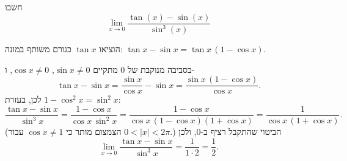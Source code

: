 
\begin{question}
חשבו
\[ \lim_{x\to0}\frac{\tan(x)-\sin(x)}{\sin^3(x)} \]
\end{question}

\begin{hint}
הוציאו $\tan x$ כגורם משותף במונה: $\tan x-\sin x=\tan x\,(1-\cos x)$.
\end{hint}

\begin{solution}
בסביבה מנוקבת של $0$ מתקיים $\sin x\neq0$, $\cos x\neq0$, ו-
\[ \tan x-\sin x=\frac{\sin x}{\cos x}-\sin x=\frac{\sin x\,(1-\cos x)}{\cos x}. \]
לכן, בעזרת $1-\cos^2x=\sin^2x$:
\[ \frac{\tan x-\sin x}{\sin^3x}=\frac{1-\cos x}{\cos x\,\sin^2x}=\frac{1-\cos x}{\cos x\,(1-\cos x)(1+\cos x)}=\frac{1}{\cos x\,(1+\cos x)}. \]
(הצמצום מותר כי $\cos x\neq1$ עבור $0<|x|<2\pi$.) הביטוי שהתקבל רציף ב-$0$, ולכן
\[ \lim_{x\to0}\frac{\tan x-\sin x}{\sin^3x}=\frac{1}{1\cdot2}=\boxed{\frac12}. \]
\end{solution}
